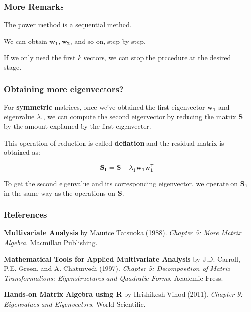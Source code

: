\documentclass[12pt]{beamer}\usepackage[]{graphicx}\usepackage[]{color}
\begin{document}

\begin{frame}
\frametitle{More Remarks}

\bbi
  \item The power method is a sequential method.
  \item We can obtain $\mathbf{w_1, w_2}$, and so on, step by step.
  \item If we only need the first $k$ vectors, we can stop the procedure at the desired stage.
\ei

\end{frame}


\begin{frame}
\frametitle{Obtaining more eigenvectors?}

For \textbf{symmetric} matrices, once we've obtained the first eigenvector 
$\mathbf{w_1}$ and eigenvalue $\lambda_1$, we can compute the second eigenvector 
by reducing the matrix $\mathbf{S}$ by the 
amount explained by the first eigenvector. 

\bigskip
This operation of reduction is called \textbf{deflation} 
and the residual matrix is obtained as:

{\large
$$
\mathbf{S_1} = \mathbf{S} - \lambda_1 \mathbf{w_1 w_{1}^\mathsf{T}}
$$
}

To get the second eigenvalue and its corresponding eigenvector, 
we operate on $\mathbf{S_1}$ in the same way as the operations on $\mathbf{S}$.

\end{frame}


\begin{frame}
\frametitle{References}

{\footnotesize
\bi
  \item \textbf{Multivariate Analysis} by Maurice Tatsuoka (1988).
  \textit{Chapter 5: More Matrix Algebra}. Macmillan Publishing.
  \item \textbf{Mathematical Tools for Applied Multivariate Analysis} by J.D. Carroll, P.E. Green, and A. Chaturvedi (1997). 
  \textit{Chapter 5: Decomposition of Matrix Transformations: Eigenstructures and Quadratic Forms}. Academic Press. 
  \item \textbf{Hands-on Matrix Algebra using R} by Hrishikesh Vinod (2011).
  \textit{Chapter 9: Eigenvalues and Eigenvectors}. World Scientific.
\ei
}

\end{frame}

\end{document}
